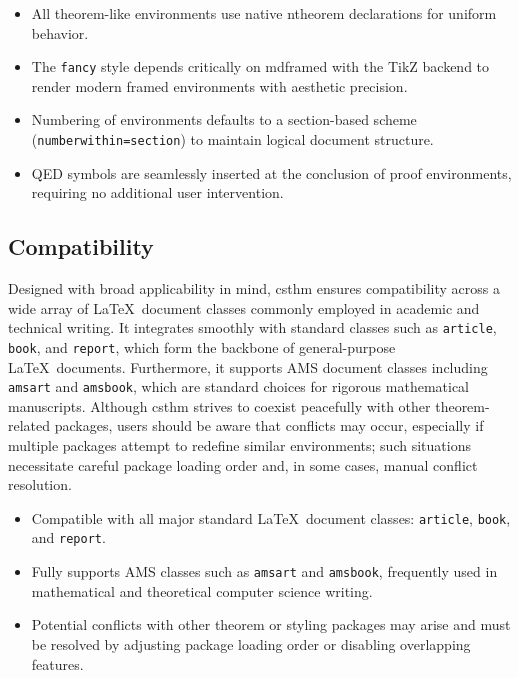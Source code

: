 \documentclass[10pt,letterpaper]{amsart}
\begin{document}
\begin{itemize}[label={--}]
	\item All theorem-like environments use native \textsf{ntheorem} declarations for uniform behavior.
	\item The \texttt{fancy} style depends critically on \textsf{mdframed} with the
	      \textsf{TikZ} backend to render modern framed environments with aesthetic
	      precision.
	\item Numbering of environments defaults to a section-based scheme
	      (\texttt{numberwithin=section}) to maintain logical document structure.
	\item QED symbols are seamlessly inserted at the conclusion of proof environments,
	      requiring no additional user intervention.
\end{itemize}

\subsection{Compatibility}

Designed with broad applicability in mind, \textsf{csthm} ensures compatibility
across a wide array of \LaTeX\ document classes commonly employed in academic
and technical writing. It integrates smoothly with standard classes such as
\texttt{article}, \texttt{book}, and \texttt{report}, which form the backbone
of general-purpose \LaTeX\ documents. Furthermore, it supports AMS document
classes including \texttt{amsart} and \texttt{amsbook}, which are standard
choices for rigorous mathematical manuscripts. Although \textsf{csthm} strives
to coexist peacefully with other theorem-related packages, users should be
aware that conflicts may occur, especially if multiple packages attempt to
redefine similar environments; such situations necessitate careful package
loading order and, in some cases, manual conflict resolution.

\begin{itemize}[label={--}]
	\item Compatible with all major standard \LaTeX\ document classes: \texttt{article},
	      \texttt{book}, and \texttt{report}.
	\item Fully supports AMS classes such as \texttt{amsart} and \texttt{amsbook},
	      frequently used in mathematical and theoretical computer science writing.
	\item Potential conflicts with other theorem or styling packages may arise and must
	      be resolved by adjusting package loading order or disabling overlapping
	      features.
\end{itemize}
\end{document}

